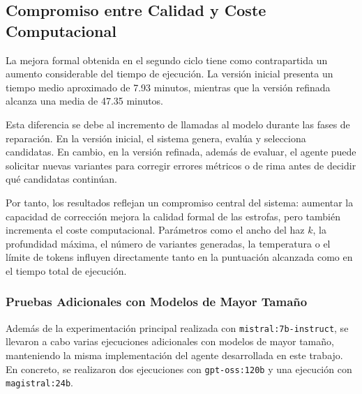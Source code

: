 \documentclass[12pt,a4paper,twoside,openright]{book}
\begin{document}















\subsection{Compromiso entre Calidad y Coste Computacional}

La mejora formal obtenida en el segundo ciclo tiene como contrapartida un aumento considerable del tiempo de ejecución. La versión inicial presenta un tiempo medio aproximado de 7.93 minutos, mientras que la versión refinada alcanza una media de 47.35 minutos.

Esta diferencia se debe al incremento de llamadas al modelo durante las fases de reparación. En la versión inicial, el sistema genera, evalúa y selecciona candidatas.
En cambio, en la versión refinada, además de evaluar, el agente puede solicitar nuevas variantes para corregir errores métricos o de rima antes de decidir qué candidatas continúan.

Por tanto, los resultados reflejan un compromiso central del sistema: aumentar la capacidad de corrección mejora la calidad formal de las estrofas, pero también incrementa el coste computacional.
Parámetros como el ancho del haz $k$, la profundidad máxima, el número de variantes generadas, la temperatura o el límite de tokens influyen directamente tanto en la puntuación alcanzada como en el tiempo total de ejecución.


\subsubsection{Pruebas Adicionales con Modelos de Mayor Tamaño}

Además de la experimentación principal realizada con \texttt{mistral:7b-instruct}, se llevaron a cabo varias ejecuciones adicionales con modelos de mayor tamaño, manteniendo la misma implementación del agente desarrollada en este trabajo.
En concreto, se realizaron dos ejecuciones con \texttt{gpt-oss:120b} y una ejecución con \texttt{magistral:24b}.
\end{document}
